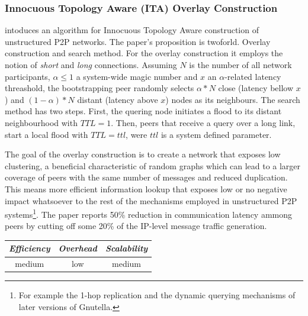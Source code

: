\subsubsection{Innocuous Topology Aware (ITA) Overlay Construction}
\cite{PRFM2009} intoduces an algorithm for Innocuous Topology Aware
construction of unstructured P2P networks. The paper's proposition is twoforld.
Overlay construction and search method. For the overlay construction it employs
the notion of \emph{short} and \emph{long} connections. Assuming $N$ is the
number of all network participants, $\alpha \leq 1 $ a system-wide magic number
and $x$ an $\alpha$-related latency threashold, the bootstrapping peer randomly
selects $\alpha \ast N$ close (latency bellow $x$) and
$\left( 1 - \alpha \right) \ast N$ distant (latency above $x$) nodes as its
neighbours. The search method has two steps. First, the quering node initiates a
flood to its distant neighbourhood with $TTL = 1$. Then, peers that receive a
query over a long link, start a local flood with $TTL = ttl$, were $ttl$ is a
system defined parameter.

The goal of the overlay construction is to create a network that exposes low
clustering, a beneficial characteristic of random graphs which can lead to a
larger coverage of peers with the same number of messages and reduced
duplication. This means more efficient information lookup that exposes low or no
negative impact whatsoever to the rest of the mechanisms employed in
unstructured P2P systems\footnote{For example the 1-hop replication and the
dynamic querying mechanisms of later versions of Gnutella.}. The paper reports
50\% reduction in communication latency ammong peers by cutting off some 20\% of
the IP-level message traffic generation.

\begin{center}
\begin{tabular}{ccc}
\emph{Efficiency} & \emph{Overhead} & \emph{Scalability} \\
\hline
medium &
low &
medium
\end{tabular}
\end{center}

